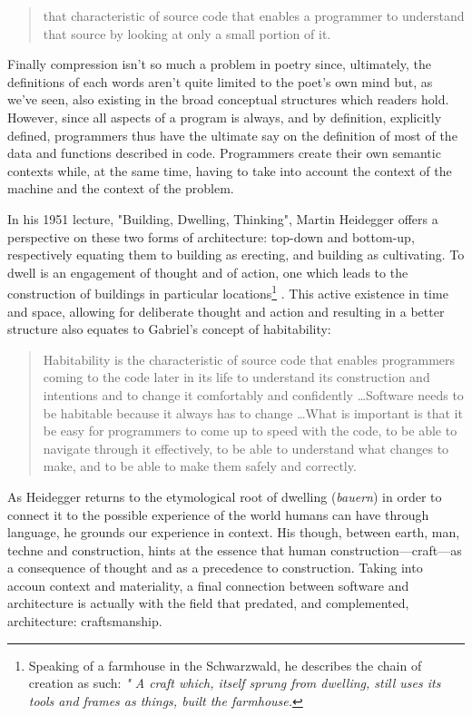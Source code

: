 \begin{quote}
    that characteristic of source code that enables a programmer to understand that source by looking at only a small portion of it. \citep{gabriel_patterns_1998}
\end{quote}

Finally compression isn't so much a problem in poetry since, ultimately, the definitions of each words aren't quite limited to the poet's own mind but, as we've seen, also existing in the broad conceptual structures which readers hold. However, since all aspects of a program is always, and by definition, explicitly defined, programmers thus have the ultimate say on the definition of most of the data and functions described in code. Programmers create their own semantic contexts while, at the same time, having to take into account the context of the machine and the context of the problem.

In his 1951 lecture, "Building, Dwelling, Thinking", Martin Heidegger offers a perspective on these two forms of architecture: top-down and bottom-up, respectively equating them to building as erecting, and building as cultivating. To dwell is an engagement of thought and of action, one which leads to the construction of buildings in particular locations\footnote{Speaking of a farmhouse in the Schwarzwald, he describes the chain of creation as such: \emph{" A craft which, itself sprung from dwelling, still uses its tools and frames as things, built the farmhouse.}} \citep{heidegger_building_1975}. This active existence in time and space, allowing for deliberate thought and action and resulting in a better structure also equates to Gabriel's concept of habitability:

\begin{quote}
    Habitability is the characteristic of source code that enables programmers coming to the code later in its life to understand its construction and intentions and to change it comfortably and confidently \dots Software needs to be habitable because it always has to change \dots What is important is that it be easy for programmers to come up to speed with the code, to be able to navigate through it effectively, to be able to understand what changes to make, and to be able to make them safely and correctly. \citep{gabriel_patterns_1998}
\end{quote}

As Heidegger returns to the etymological root of dwelling (\emph{bauern}) in order to connect it to the possible experience of the world humans can have through language, he grounds our experience in context. His though, between earth, man, techne and construction, hints at the essence that human construction—craft—as a consequence of thought and as a precedence to construction. Taking into accoun context and materiality, a final connection between software and architecture is actually with the field that predated, and complemented, architecture: craftsmanship.

